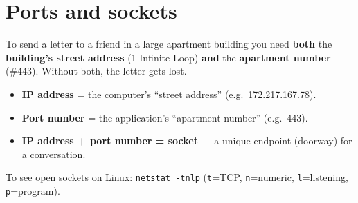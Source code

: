 \section{Ports and sockets}
\begin{analogy}
To send a letter to a friend in a large apartment building you need \textbf{both} the \textbf{building's street address} (1 Infinite Loop) \textbf{and} the \textbf{apartment number} (\#443). Without both, the letter gets lost.
\end{analogy}
\begin{itemize}
  \item \textbf{IP address} = the computer's ``street address'' (e.g.\ 172.217.167.78).
  \item \textbf{Port number} = the application's ``apartment number'' (e.g.\ 443).
  \item \textbf{IP address + port number = socket} --- a unique endpoint (doorway) for a conversation.
\end{itemize}

\begin{center}
\end{center}
To see open sockets on Linux: \texttt{netstat -tnlp} (\texttt{t}=TCP, \texttt{n}=numeric, \texttt{l}=listening, \texttt{p}=program).

